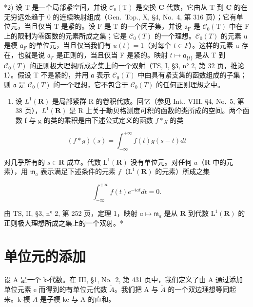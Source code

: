 *2) 设 \(\mathrm{T}\) 是一个局部紧空间，并设 \(\mathcal{C}_0(\mathrm{T})\) 是交换 \(\mathbf{C}\)-代数，它由从 \(\mathrm{T}\) 到 \(\mathbf{C}\) 的在无穷远处趋于 0 的连续映射组成（Gen.~Top., X, §4, No.~4, 第 316 页）；它有单位元，当且仅当 \(\mathrm{T}\) 是紧的。设 \(\mathrm{F}\) 是 \(\mathrm{T}\) 的一个闭子集，并设 \(\mathfrak{a}_{\mathrm{F}}\) 是 \(\mathcal{C}_0(\mathrm{T})\) 中在 F 上的限制为零函数的元素所成之集；它是 \(\mathcal{C}_{0}(T)\) 的一个理想。\(\mathcal{C}_{0}(T)\) 的元素 u 是模 \(\mathfrak{a}_{F}\) 的单位元，当且仅当我们有 \(u(t)=1\)（对每个 \(t\in F\)）。这样的元素 u 存在，也就是说 \(\mathfrak{a}_{F}\) 是正则的，当且仅当 F 是紧的。映射 \(t\mapsto \mathfrak{a}_{\{t\}}\) 是从 T 到 \(\mathcal{C}_{0}(T)\) 的正则极大理想所成之集上的一个双射（TS, I, §3, n° 2, 第 32 页，推论 1）。假设 T 不是紧的，并用 \(\mathfrak{a}\) 表示 \(\mathcal{C}_{0}(T)\) 中由具有紧支集的函数组成的子集；则 \(\mathfrak{a}\) 是 \(\mathcal{C}_{0}(T)\) 的一个理想，它不包含于 \(\mathcal{C}_{0}(T)\) 的任何正则理想之中。

\begin{enumerate}
\def\labelenumi{\arabic{enumi})}
\setcounter{enumi}{2}
\tightlist
\item
  设 \(L^{1}(\mathbf{R})\) 是局部紧群 R 的卷积代数。回忆（参见 Int., VIII, §4, No.~5, 第 38 页），\(L^{1}(\mathbf{R})\) 是 R 上关于勒贝格测度可积的函数的类所成的空间。两个函数 f 与 g 的类的乘积是由下述公式定义的函数 \(f * g\) 的类
\end{enumerate}

\[
(f * g) (s) = \int_ {- \infty} ^ {+ \infty} f (t) g (s - t) d t
\]

对几乎所有的 \(s \in \mathbf{R}\) 成立。代数 \(\mathrm{L}^1(\mathbf{R})\) 没有单位元。对任何 \(a\)（\(\mathbf{R}\) 中的元素），用 \(\mathfrak{m}_a\) 表示满足下述条件的元素 \(f\)（\(\mathrm{L}^1(\mathbf{R})\) 的元素）所成之集

\[
\int_ {- \infty} ^ {+ \infty} f (t) e ^ {- i a t} d t = 0.
\]

由 TS, II, §3, n° 2, 第 252 页，定理 1，映射 \(a \mapsto \mathfrak{m}_a\) 是从 \(\mathbf{R}\) 到代数 \(\mathrm{L}^1(\mathbf{R})\) 的正则极大理想所成之集上的一个双射。*

\section{单位元的添加}

设 A 是一个 k-代数。在 III, §1, No.~2, 第 431 页中，我们定义了由 A 通过添加单位元素 e 而得到的有单位元代数 \(\widetilde{A}\)。我们把 A 与 \(\widetilde{A}\) 的一个双边理想等同起来。k-模 \(\widetilde{A}\) 是子模 ke 与 A 的直和。

